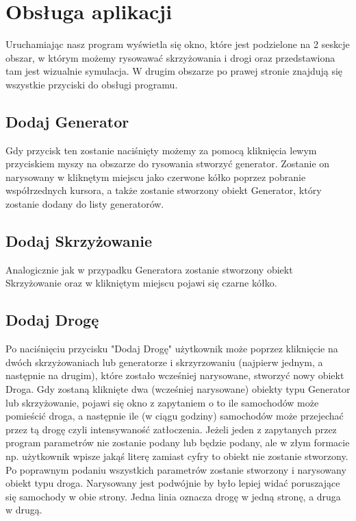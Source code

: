 \documentclass{article}
\begin{document}
\section{Obsługa aplikacji}
    Uruchamiając nasz program wyświetla się okno, które jest podzielone na 2 seskcje obszar, w którym możemy rysowawać skrzyżowania i drogi oraz przedstawiona tam jest wizualnie symulacja. W drugim obszarze po prawej stronie znajdują się wszystkie przyciski do obsługi programu.

\subsection{Dodaj Generator}
    Gdy przycisk ten zostanie naciśnięty możemy za pomocą kliknięcia lewym przyciskiem myszy na obszarze do rysowania stworzyć generator. Zostanie on narysowany w kliknętym miejscu jako czerwone kółko poprzez pobranie współrzednych kursora, a także zostanie stworzony obiekt Generator, który zostanie dodany do listy generatorów.

\subsection{Dodaj Skrzyżowanie}
    Analogicznie jak w przypadku Generatora zostanie stworzony obiekt Skrzyżowanie oraz w klikniętym miejscu pojawi się czarne kółko.

\subsection{Dodaj Drogę}
    Po naciśnięciu przycisku "Dodaj Drogę" użytkownik może poprzez kliknięcie na dwóch skrzyżowaniach lub generatorze i skrzyrzowaniu (najpierw jednym, a następnie na drugim), które zostało wcześniej narysowane, stworzyć nowy obiekt Droga. Gdy zostaną kliknięte dwa (wcześniej narysowane) obiekty typu Generator lub skrzyżowanie, pojawi się okno z zapytaniem o to ile samochodów może pomieścić droga, a następnie ile (w ciągu godziny) samochodów może przejechać przez tą drogę czyli intensywaność zatłoczenia. Jeżeli jeden z zapytanych przez program parametrów nie zostanie podany lub będzie podany, ale w złym formacie np. użytkownik wpisze jakąś literę zamiast cyfry to obiekt nie zostanie stworzony. Po poprawnym podaniu wszystkich parametrów zostanie stworzony i narysowany obiekt typu droga. Narysowany jest podwójnie by było lepiej widać poruszające się samochody w obie strony. Jedna linia oznacza drogę w jedną stronę, a druga w drugą.
\end{document}
